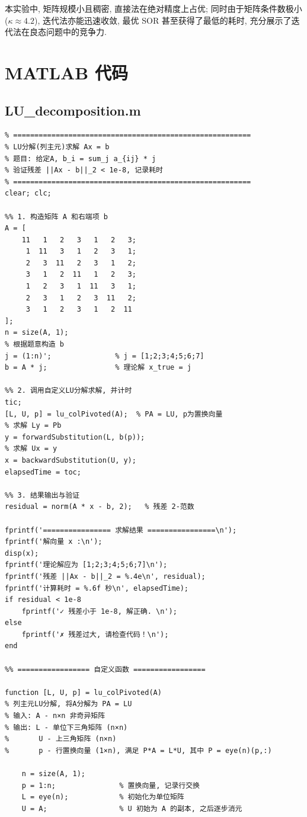 \documentclass[12pt,a4paper]{ctexart}
\begin{document}
本实验中, 矩阵规模小且稠密, 直接法在绝对精度上占优; 同时由于矩阵条件数极小($\kappa\approx4.2$), 迭代法亦能迅速收敛, 最优 SOR 甚至获得了最低的耗时, 充分展示了迭代法在良态问题中的竞争力. 
\appendix
\section{MATLAB 代码}
\subsection{LU\_decomposition.m}\label{code:LU-decomposition}
\begin{lstlisting}
% ========================================================
% LU分解(列主元)求解 Ax = b
% 题目: 给定A, b_i = sum_j a_{ij} * j
% 验证残差 ||Ax - b||_2 < 1e-8, 记录耗时
% ========================================================
clear; clc;

%% 1. 构造矩阵 A 和右端项 b
A = [
    11   1   2   3   1   2   3;
     1  11   3   1   2   3   1;
     2   3  11   2   3   1   2;
     3   1   2  11   1   2   3;
     1   2   3   1  11   3   1;
     2   3   1   2   3  11   2;
     3   1   2   3   1   2  11
];
n = size(A, 1);
% 根据题意构造 b
j = (1:n)';               % j = [1;2;3;4;5;6;7]
b = A * j;                % 理论解 x_true = j

%% 2. 调用自定义LU分解求解, 并计时
tic;
[L, U, p] = lu_colPivoted(A);  % PA = LU, p为置换向量
% 求解 Ly = Pb
y = forwardSubstitution(L, b(p));
% 求解 Ux = y
x = backwardSubstitution(U, y);
elapsedTime = toc;

%% 3. 结果输出与验证
residual = norm(A * x - b, 2);   % 残差 2-范数

fprintf('================ 求解结果 ================\n');
fprintf('解向量 x :\n');
disp(x);
fprintf('理论解应为 [1;2;3;4;5;6;7]\n');
fprintf('残差 ||Ax - b||_2 = %.4e\n', residual);
fprintf('计算耗时 = %.6f 秒\n', elapsedTime);
if residual < 1e-8
    fprintf('✓ 残差小于 1e-8, 解正确. \n');
else
    fprintf('✗ 残差过大, 请检查代码！\n');
end

%% ================= 自定义函数 =================

function [L, U, p] = lu_colPivoted(A)
% 列主元LU分解, 将A分解为 PA = LU
% 输入: A - n×n 非奇异矩阵
% 输出: L - 单位下三角矩阵 (n×n)
%       U - 上三角矩阵 (n×n)
%       p - 行置换向量 (1×n), 满足 P*A = L*U, 其中 P = eye(n)(p,:)

    n = size(A, 1);
    p = 1:n;               % 置换向量, 记录行交换
    L = eye(n);            % 初始化为单位矩阵
    U = A;                 % U 初始为 A 的副本, 之后逐步消元


\end{lstlisting}
\end{document}
